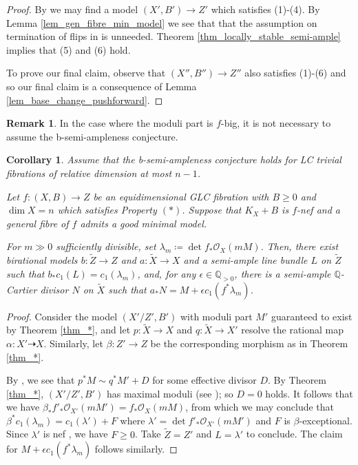 \documentclass[12pt]{amsart}
\theoremstyle{plain}
\newtheorem{corollary}[theorem]{Corollary}
\theoremstyle{definition}
\newtheorem{remark}[theorem]{Remark}
\def\dim{\operatorname{dim}}
\def\det{\operatorname{det}}
\def \QP {\mathbb Q_{>0}}
\begin{document}
\begin{proof}
By \cite[Theorem 1.1]{ACSS} we may find a model $(X', B') \rightarrow Z'$ which satisfies (1)-(4).
By Lemma \ref{lem_gen_fibre_min_model} we see that that the assumption on termination of flips in 
\cite[Theorem 1.1]{ACSS} is unneeded.
Theorem \ref{thm_locally_stable_semi-ample} implies that (5) and (6) hold.



To prove our final claim, observe that $(X'', B'') \rightarrow Z''$ also satisfies
(1)-(6) and so our final claim is a consequence of Lemma \ref{lem_base_change_pushforward}.
\end{proof}

\begin{remark}
In the case where the moduli part is $f$-big, it is not necessary to assume the b-semi-ampleness conjecture.
\end{remark}



\begin{corollary}
Assume that the 
b-semi-ampleness conjecture holds for LC trivial fibrations of relative dimension at most $n-1$.

Let $f\colon (X, B) \rightarrow Z$ be an equidimensional 
GLC fibration with $B \geq 0$ and $\dim X= n$ which satisfies Property $(*)$.
Suppose that $K_X+B$ is $f$-nef and a general fibre of $f$ admits a good minimal model.

For $m \gg 0$ sufficiently divisible, set $\lambda_m \coloneqq \det f_*\mathcal O_X(mM)$.  
Then, there exist birational models $b\colon \tilde{Z} \rightarrow Z$ 
and $a\colon \tilde{X} \rightarrow X$ and a semi-ample line bundle $L$ on $\tilde{Z}$ 
such that $b_*c_1(L) = c_1(\lambda_m)$,
and, for any $\epsilon \in \QP$, there is a semi-ample $\mathbb{Q}$-Cartier divisor $N$ on $\tilde{X}$
such that $a_*N = M+\epsilon c_1(f^*\lambda_m)$.


\end{corollary}

\begin{proof}
Consider the model $(X'/Z', B')$ with moduli part $M'$ guaranteed to exist by Theorem \ref{thm_*}, 
and let $p\colon \tilde{X} \rightarrow X$ and $q\colon \tilde{X} \rightarrow X'$ resolve the 
rational map $\alpha\colon X' \dashrightarrow X$.
Similarly, let $\beta \colon Z' \rightarrow Z$ be the corresponding morphism as in Theorem \ref{thm_*}.

By \cite[Proposition 2.21]{ACSS}, we see that $p^*M \sim q^*M' + D$ for some effective divisor $D$.
By Theorem \ref{thm_*}, $(X'/Z',B')$ has maximal moduli (see \cite[Definition 2.20]{ACSS});
so $D=0$ holds.
It follows that we have $\beta_*f'_*\mathcal O_{X'}(mM')  = f_*\mathcal O_X(mM)$,
from which we may conclude that $\beta^*c_1(\lambda_m) = c_1(\lambda')+F$ where 
$\lambda' = \det f'_*\mathcal O_{X'}(mM')$ and $F$ is $\beta$-exceptional.  Since $\lambda'$ is nef
\cite[Lemma 3.39]{KM98}, we have $F \geq 0$.  Take $\tilde{Z}=Z'$ and $L = \lambda'$ to conclude.  
The claim for $M+\epsilon c_1( f^*\lambda_m)$ follows similarly.
\end{proof}
\end{document}
